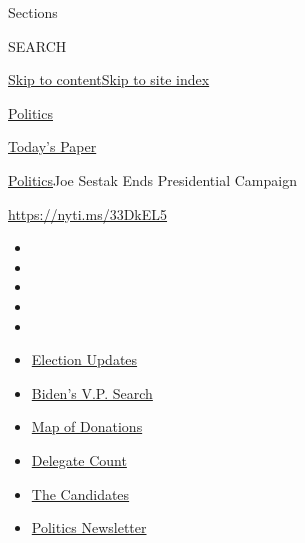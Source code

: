 Sections

SEARCH

\protect\hyperlink{site-content}{Skip to
content}\protect\hyperlink{site-index}{Skip to site index}

\href{https://www.nytimes.com/section/politics}{Politics}

\href{https://myaccount.nytimes.com/auth/login?response_type=cookie\&client_id=vi}{}

\href{https://www.nytimes.com/section/todayspaper}{Today's Paper}

\href{/section/politics}{Politics}\textbar{}Joe Sestak Ends Presidential
Campaign

\url{https://nyti.ms/33DkEL5}

\begin{itemize}
\item
\item
\item
\item
\item
\end{itemize}

\begin{itemize}
\item
  \href{https://www.nytimes.com/2020/07/31/us/elections/biden-vs-trump.html?action=click\&pgtype=Article\&state=default\&region=TOP_BANNER\&context=storylines_menu}{Election
  Updates}
\item
  \href{https://www.nytimes.com/article/biden-vice-president-2020.html?action=click\&pgtype=Article\&state=default\&region=TOP_BANNER\&context=storylines_menu}{Biden's
  V.P. Search}
\item
  \href{https://www.nytimes.com/interactive/2020/07/24/us/politics/trump-biden-campaign-donors.html?action=click\&pgtype=Article\&state=default\&region=TOP_BANNER\&context=storylines_menu}{Map
  of Donations}
\item
  \href{https://www.nytimes.com/interactive/2020/us/elections/delegate-count-primary-results.html?action=click\&pgtype=Article\&state=default\&region=TOP_BANNER\&context=storylines_menu}{Delegate
  Count}
\item
  \href{https://www.nytimes.com/interactive/2019/us/politics/2020-presidential-candidates.html?action=click\&pgtype=Article\&state=default\&region=TOP_BANNER\&context=storylines_menu}{The
  Candidates}
\item
  \href{https://www.nytimes.com/newsletters/politics?action=click\&pgtype=Article\&state=default\&region=TOP_BANNER\&context=storylines_menu}{Politics
  Newsletter}
\end{itemize}

